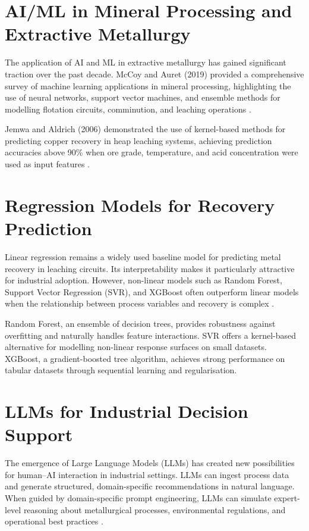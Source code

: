 \documentclass[12pt,a4paper]{report}
\begin{document}
\section{AI/ML in Mineral Processing and Extractive Metallurgy}

The application of AI and ML in extractive metallurgy has gained significant traction over the past decade. McCoy and Auret (2019) provided a comprehensive survey of machine learning applications in mineral processing, highlighting the use of neural networks, support vector machines, and ensemble methods for modelling flotation circuits, comminution, and leaching operations \cite{mccoy2019ml}.

Jemwa and Aldrich (2006) demonstrated the use of kernel-based methods for predicting copper recovery in heap leaching systems, achieving prediction accuracies above 90\% when ore grade, temperature, and acid concentration were used as input features \cite{jemwa2006kernel}.

\section{Regression Models for Recovery Prediction}

Linear regression remains a widely used baseline model for predicting metal recovery in leaching circuits. Its interpretability makes it particularly attractive for industrial adoption. However, non-linear models such as Random Forest, Support Vector Regression (SVR), and XGBoost often outperform linear models when the relationship between process variables and recovery is complex \cite{breiman2001random, chen2016xgboost}.

Random Forest, an ensemble of decision trees, provides robustness against overfitting and naturally handles feature interactions. SVR offers a kernel-based alternative for modelling non-linear response surfaces on small datasets. XGBoost, a gradient-boosted tree algorithm, achieves strong performance on tabular datasets through sequential learning and regularisation.

\section{LLMs for Industrial Decision Support}

The emergence of Large Language Models (LLMs) has created new possibilities for human–AI interaction in industrial settings. LLMs can ingest process data and generate structured, domain-specific recommendations in natural language. When guided by domain-specific prompt engineering, LLMs can simulate expert-level reasoning about metallurgical processes, environmental regulations, and operational best practices \cite{openai2024gpt}.
\end{document}
